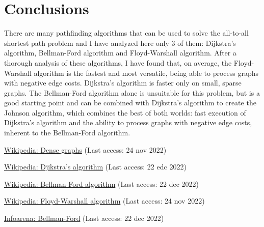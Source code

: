 \documentclass[runningheads]{llncs}
\begin{document}
\section{Conclusions}
There are many pathfinding algorithms that can be used to solve the all-to-all shortest path problem and I have analyzed here only 3 of them: Dijkstra's algorithm, Bellman-Ford algorithm and Floyd-Warshall algorithm. After a thorough analysis of these algorithms, I have found that, on average, the Floyd-Warshall algorithm is the fastest and most versatile, being able to process graphs with negative edge costs. Dijkstra's algorithm is faster only on small, sparse graphs. The Bellman-Ford algorithm alone is unsuitable for this problem, but is a good starting point and can be combined with Dijkstra's algorithm to create the Johnson algorithm, which combines the best of both worlds: fast execution of Dijkstra's algorithm and the ability to process graphs with negative edge costs, inherent to the Bellman-Ford algorithm.

%
%
%

% 
%
\begin{thebibliography}{8}
\href{https://en.wikipedia.org/wiki/Dense_graph}{Wikipedia: Dense graphs} (Last access: 24 nov 2022)

\href{https://en.wikipedia.org/wiki/Dijkstra\%27s_algorithm}{Wikipedia: Djikstra's algorithm} (Last access: 22 edc 2022)

\href{https://en.wikipedia.org/wiki/Bellman\%E2\%80\%93Ford_algorithm}{Wikipedia: Bellman-Ford algorithm} (Last access: 22 dec 2022)

\href{https://en.wikipedia.org/wiki/Floyd\%E2\%80\%93Warshall_algorithm}{Wikipedia: Floyd-Warshall algorithm} (Last access: 24 nov 2022)

\href{https://www.infoarena.ro/problema/bellmanford}{Infoarena: Bellman-Ford} (Last access: 22 dec 2022)
\end{thebibliography}

\newpage
\end{document}

